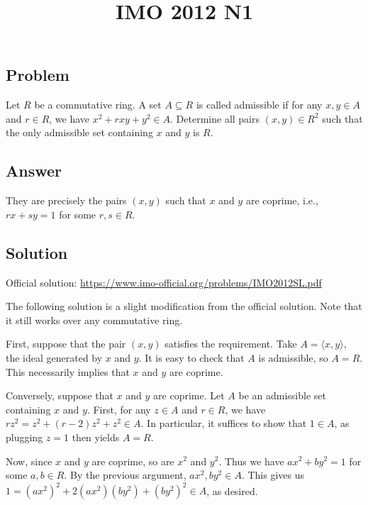 \documentclass{article}
\title{IMO 2012 N1}
\author{}
\date{}
\begin{document}
\maketitle



\subsection*{Problem}

Let $R$ be a commutative ring.
A set $A \subseteq R$ is called admissible if for any $x, y \in A$ and $r \in R$, we have $x^2 + rxy + y^2 \in A$.
Determine all pairs $(x, y) \in R^2$ such that the only admissible set containing $x$ and $y$ is $R$.



\subsection*{Answer}

They are precisely the pairs $(x, y)$ such that $x$ and $y$ are coprime, i.e., $rx + sy = 1$ for some $r, s \in R$.



\subsection*{Solution}

Official solution: \url{https://www.imo-official.org/problems/IMO2012SL.pdf}

The following solution is a slight modification from the official solution.
Note that it still works over any commutative ring.

First, suppose that the pair $(x, y)$ satisfies the requirement.
Take $A = \langle x, y \rangle$, the ideal generated by $x$ and $y$.
It is easy to check that $A$ is admissible, so $A = R$.
This necessarily implies that $x$ and $y$ are coprime.

Conversely, suppose that $x$ and $y$ are coprime.
Let $A$ be an admissible set containing $x$ and $y$.
First, for any $z \in A$ and $r \in R$, we have $rz^2 = z^2 + (r - 2) z^2 + z^2 \in A$.
In particular, it suffices to show that $1 \in A$, as plugging $z = 1$ then yields $A = R$.

Now, since $x$ and $y$ are coprime, so are $x^2$ and $y^2$.
Thus we have $ax^2 + by^2 = 1$ for some $a, b \in R$.
By the previous argument, $ax^2, by^2 \in A$.
This gives us $1 = (ax^2)^2 + 2(ax^2)(by^2) + (by^2)^2 \in A$, as desired.
\end{document}
